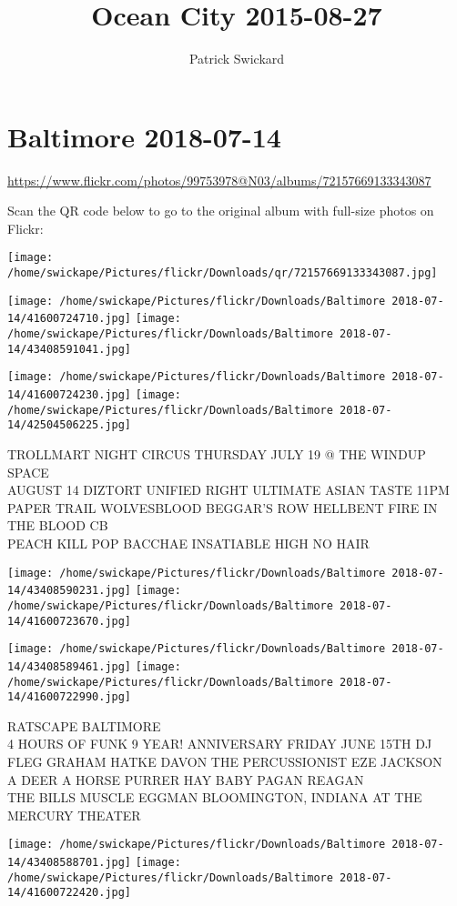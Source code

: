 \documentclass[10pt,letterpaper]{article}
\title{Ocean City 2015-08-27}
\author{Patrick Swickard}
\date{}
\begin{document}
\section*{Baltimore 2018-07-14}

\url{https://www.flickr.com/photos/99753978@N03/albums/72157669133343087}

Scan the QR code below to go to the original album with full-size photos on Flickr:

\texttt{[image: /home/swickape/Pictures/flickr/Downloads/qr/72157669133343087.jpg]}
\pagebreak

\texttt{[image: /home/swickape/Pictures/flickr/Downloads/Baltimore 2018-07-14/41600724710.jpg]}
\texttt{[image: /home/swickape/Pictures/flickr/Downloads/Baltimore 2018-07-14/43408591041.jpg]}

\texttt{[image: /home/swickape/Pictures/flickr/Downloads/Baltimore 2018-07-14/41600724230.jpg]}
\texttt{[image: /home/swickape/Pictures/flickr/Downloads/Baltimore 2018-07-14/42504506225.jpg]}

TROLLMART NIGHT CIRCUS THURSDAY JULY 19 @ THE WINDUP SPACE\\
AUGUST 14 DIZTORT UNIFIED RIGHT ULTIMATE ASIAN TASTE 11PM\\
PAPER TRAIL WOLVESBLOOD BEGGAR'S ROW HELLBENT FIRE IN THE BLOOD CB\\
PEACH KILL POP BACCHAE INSATIABLE HIGH NO HAIR
\pagebreak

\texttt{[image: /home/swickape/Pictures/flickr/Downloads/Baltimore 2018-07-14/43408590231.jpg]}
\texttt{[image: /home/swickape/Pictures/flickr/Downloads/Baltimore 2018-07-14/41600723670.jpg]}

\texttt{[image: /home/swickape/Pictures/flickr/Downloads/Baltimore 2018-07-14/43408589461.jpg]}
\texttt{[image: /home/swickape/Pictures/flickr/Downloads/Baltimore 2018-07-14/41600722990.jpg]}

RATSCAPE BALTIMORE\\
4 HOURS OF FUNK 9 YEAR! ANNIVERSARY FRIDAY JUNE 15TH DJ FLEG GRAHAM HATKE DAVON THE PERCUSSIONIST EZE JACKSON\\
A DEER A HORSE PURRER HAY BABY PAGAN REAGAN\\
THE BILLS MUSCLE EGGMAN BLOOMINGTON, INDIANA AT THE MERCURY THEATER
\pagebreak

\texttt{[image: /home/swickape/Pictures/flickr/Downloads/Baltimore 2018-07-14/43408588701.jpg]}
\texttt{[image: /home/swickape/Pictures/flickr/Downloads/Baltimore 2018-07-14/41600722420.jpg]}
\end{document}
